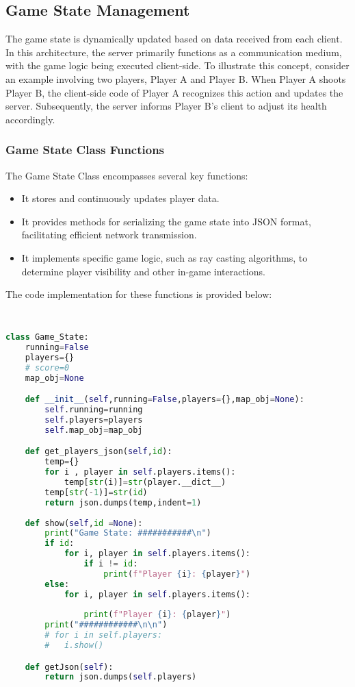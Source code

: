 \subsection{Game State Management}
The game state is dynamically updated based on data received from each client. In this architecture, the server primarily functions as a communication medium, with the game logic being executed client-side. To illustrate this concept, consider an example involving two players, Player A and Player B. When Player A shoots Player B, the client-side code of Player A recognizes this action and updates the server. Subsequently, the server informs Player B's client to adjust its health accordingly.

\subsubsection{Game State Class Functions}
The Game State Class encompasses several key functions:

\begin{itemize}
    \item It stores and continuously updates player data.
    \item It provides methods for serializing the game state into JSON format, facilitating efficient network transmission.
    \item It implements specific game logic, such as ray casting algorithms, to determine player visibility and other in-game interactions.
\end{itemize}

The code implementation for these functions is provided below:
\begin{lstlisting}[language=Python]

    
class Game_State:
    running=False
    players={}
    # score=0
    map_obj=None

    def __init__(self,running=False,players={},map_obj=None):
        self.running=running
        self.players=players
        self.map_obj=map_obj

    def get_players_json(self,id):
        temp={}
        for i , player in self.players.items():
            temp[str(i)]=str(player.__dict__)
        temp[str(-1)]=str(id)
        return json.dumps(temp,indent=1)
        
    def show(self,id =None):
        print("Game State: ###########\n")
        if id:
            for i, player in self.players.items():
                if i != id:
                    print(f"Player {i}: {player}") 
        else:
            for i, player in self.players.items():
                
                print(f"Player {i}: {player}")
        print("############\n\n")
        # for i in self.players:
        # 	i.show()

    def getJson(self):
        return json.dumps(self.players)
        \end{lstlisting}

